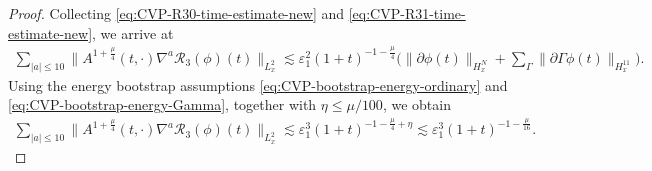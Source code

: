 \documentclass[11pt,twoside]{article}
\def\p{\partial}
\def\ve{\varepsilon}
\def\ls{\lesssim}
\theoremstyle{plain}
\theoremstyle{definition}
\theoremstyle{assumption}
\numberwithin{equation}{section}
\begin{document}
\begin{proof}
		
		Collecting \eqref{eq:CVP-R30-time-estimate-new} and
		\eqref{eq:CVP-R31-time-estimate-new}, we arrive at
		\begin{equation}
			\label{eq:CVP-R3-time-estimate-new}
			\begin{aligned}
				\sum_{|a|\le 10}
				\big\|
				A^{1+\frac{\mu}{4}}(t,\cdot)
				\nabla^a\mathcal R_3(\phi)(t)
				\big\|_{L^2_x}
				\ls
				\ve_1^2
				(1+t)^{-1-\frac{\mu}{4}}
				\big(
				\|\p\phi(t)\|_{H^N_x}
				+
				\sum_{\Gamma}
				\|\p\Gamma\phi(t)\|_{H^{11}_x}
				\big).
			\end{aligned}
		\end{equation}
		Using the energy bootstrap assumptions
		\eqref{eq:CVP-bootstrap-energy-ordinary} and
		\eqref{eq:CVP-bootstrap-energy-Gamma}, together with
		\(\eta\le \mu/100\), we obtain
		\begin{equation}
			\label{eq:CVP-R3-time-estimate-integrable-new}
			\begin{aligned}
				\sum_{|a|\le 10}
				\big\|
				A^{1+\frac{\mu}{4}}(t,\cdot)
				\nabla^a\mathcal R_3(\phi)(t)
				\big\|_{L^2_x}
				\ls
				\ve_1^3
				(1+t)^{-1-\frac{\mu}{4}+\eta}
				\ls
				\ve_1^3
				(1+t)^{-1-\frac{\mu}{16}}.
			\end{aligned}
		\end{equation}
		

\end{proof}
\end{document}
